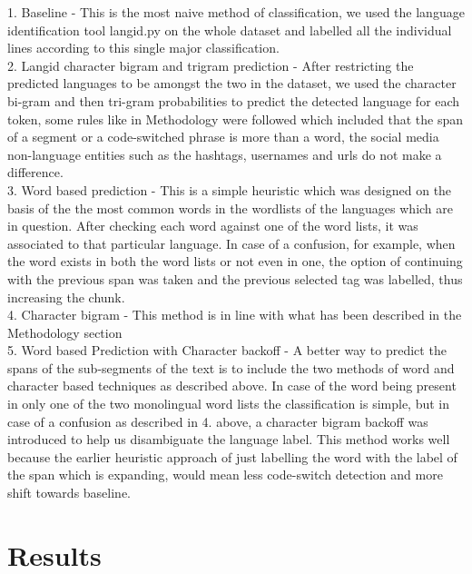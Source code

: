 \documentclass[11pt]{article}
\begin{document}
1. Baseline - This is the most naive method of classification, we used the language identification tool langid.py \cite{lui2012langid} on the whole dataset and labelled all the individual lines according to this single major classification. \\
2. Langid character bigram and trigram prediction - After restricting the predicted languages to be amongst the two in the dataset, we used the character bi-gram and then tri-gram probabilities to predict the detected language for each token, some rules like in Methodology were followed which included that the span of a segment or a code-switched phrase is more than a word, the social media non-language entities such as the hashtags, usernames and urls do not make a difference. \\
3. Word based prediction - This is a simple heuristic which was designed on the basis of the the most common words in the wordlists of the languages which are in question. After checking each word against one of the word lists, it was associated to that particular language. In case of a confusion, for example, when the word exists in both the word lists or not even in one, the option of continuing with the previous span was taken and the previous selected tag was labelled, thus increasing the chunk. \\
4. Character bigram - This method is in line with what has been described in the Methodology section \\
5. Word based Prediction with Character backoff - A better way to predict the spans of the sub-segments of the text is to include the two methods of word and character based techniques as described above. In case of the word being present in only one of the two monolingual word lists the classification is simple, but in case of a confusion as described in 4. above, a character bigram backoff was introduced to help us disambiguate the language label. This method works well because the earlier heuristic approach of just labelling the word with the label of the span which is expanding, would mean less code-switch detection and more shift towards baseline. \\


\section{Results}
\end{document}
